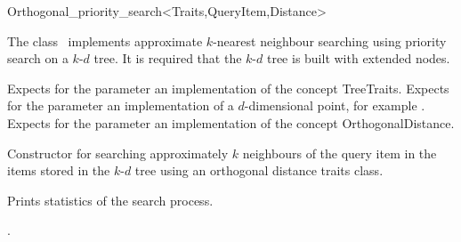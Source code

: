 

\begin{ccRefClass}{Orthogonal_priority_search<Traits,QueryItem,Distance>}  %


\ccDefinition

The class \ccRefName\ implements approximate $k$-nearest neighbour searching
using priority search on a $k$-$d$ tree. It is required that the $k$-$d$ tree is
built with extended nodes.


\ccParameters

Expects for the parameter  an implementation of the concept TreeTraits.
Expects for the parameter   an implementation
of a $d$-dimensional point, for example .
Expects for the parameter  an implementation of the concept OrthogonalDistance.

\ccTypes



\ccCreation
{}  %

{Constructor for searching approximately $k$ neighbours of the query item 
in the items stored in the $k$-$d$ tree  using an orthogonal distance
traits class.}




{
Prints statistics of the search process.
}

\ccSeeAlso

.

\end{ccRefClass}


